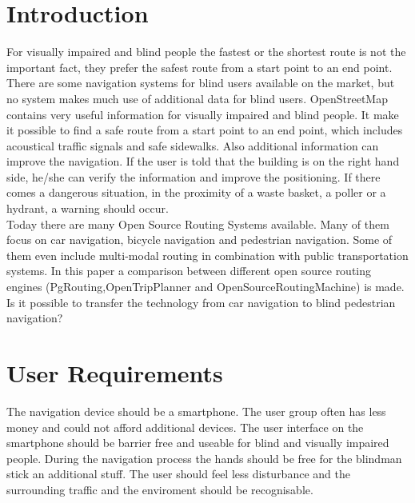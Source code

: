 \documentclass{sig-alternate}
\begin{document}

\section{Introduction}
For visually impaired and blind people the fastest or the shortest route is not the important fact, they prefer the safest route from a start point to an end point. There are some navigation systems for blind users available on the market, but no system makes much use of additional data for blind users. 
OpenStreetMap contains very useful information for visually impaired and blind people. It make it possible to find a safe route from a start point to an end point, which includes acoustical traffic signals and safe sidewalks. Also additional information can improve the navigation. If the user is told that the building is on the right hand side, he/she can verify the information and improve the positioning. If there comes a dangerous situation, in the proximity of a waste basket, a poller or a hydrant, a warning should occur. \\ 
Today there are many Open Source Routing Systems available. Many of them focus on car navigation, bicycle navigation and pedestrian navigation. Some of them even include multi-modal routing in combination with public transportation systems. In this paper a comparison between different open source routing engines (PgRouting,OpenTripPlanner and OpenSourceRoutingMachine) is made. Is it possible to transfer the technology from car navigation to blind pedestrian navigation?
\section{User Requirements}
The navigation device should be a smartphone. The user group often has less money and could not afford additional devices. The user interface on the smartphone should be barrier free and useable for blind and visually impaired people. During the navigation process the hands should be free for the blindman stick an additional stuff. The user should feel less disturbance and the surrounding traffic and the enviroment should be recognisable.  
\end{document}
